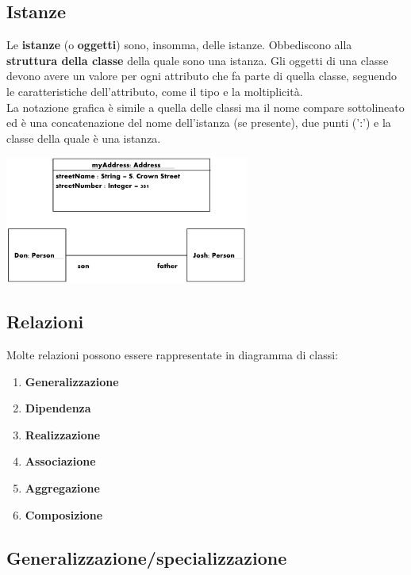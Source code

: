 \documentclass{article}
\begin{document}
\subsection*{Istanze}
\large

Le \textbf{istanze} (o \textbf{oggetti}) sono, insomma, delle istanze. Obbediscono alla \textbf{struttura della classe} della quale sono una istanza.
Gli oggetti di una classe devono avere un valore per ogni attributo che fa parte di quella classe, seguendo le caratteristiche dell'attributo, come il tipo e la moltiplicità. \\
La notazione grafica è simile a quella delle classi ma il nome compare sottolineato ed è una concatenazione del nome dell'istanza (se presente), due punti (':') e la classe della quale è una istanza. 
\begin{center}
    \includegraphics[width=0.6\textwidth]{foto 3.png}
\end{center}

\subsection*{Relazioni}
\large

Molte relazioni possono essere rappresentate in diagramma di classi:
\begin{enumerate}
    \renewcommand{\labelenumi}{-}
    \item \textbf{Generalizzazione}
    \item \textbf{Dipendenza}
    \item \textbf{Realizzazione}
    \item \textbf{Associazione}
    \item \textbf{Aggregazione}
    \item \textbf{Composizione}
\end{enumerate}

\subsection*{Generalizzazione/specializzazione}
\large
\end{document}
